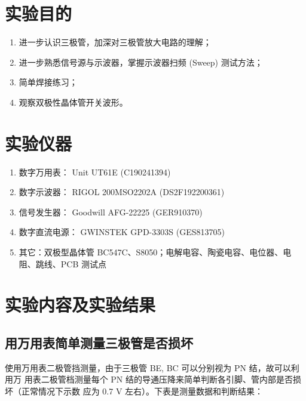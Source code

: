 \documentclass[UTF8]{article}
\begin{document}

\newpage
\section{实验目的}

\begin{enumerate}
    \item 进一步认识三极管，加深对三极管放大电路的理解；
    \item 进一步熟悉信号源与示波器，掌握示波器扫频 (Sweep) 测试方法；
    \item 简单焊接练习；
    \item 观察双极性晶体管开关波形。
\end{enumerate}


\section{实验仪器}

\begin{enumerate}
    \item 数字万用表： Unit UT61E (C190241394)
    \item 数字示波器： RIGOL 200MSO2202A (DS2F192200361)
    \item 信号发生器： Goodwill AFG-22225 (GER910370)
    \item 数字直流电源： GWINSTEK GPD-3303S (GES813705)
    \item 其它：双极型晶体管 BC547C、S8050；电解电容、陶瓷电容、电位器、电阻、跳线、PCB 测试点
\end{enumerate}

\section{实验内容及实验结果}

\subsection{用万用表简单测量三极管是否损坏}

使用万用表二极管挡测量，由于三极管 BE, BC 可以分别视为 PN 结，故可以利用万
用表二极管档测量每个 PN 结的导通压降来简单判断各引脚、管内部是否损坏（正常情况下示数
应为 0.7 V 左右）。下表是测量数据和判断结果：
\end{document}
